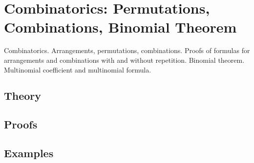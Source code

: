 
\section{Combinatorics: Permutations, Combinations, Binomial Theorem}
\label{sec:2.2.04-combinatorics-basics}

\begin{ticket}
Combinatorics. Arrangements, permutations, combinations. Proofs of formulas for arrangements and combinations with and without repetition. Binomial theorem. Multinomial coefficient and multinomial formula.
\end{ticket}

\subsection*{Theory}

\subsection*{Proofs}

\subsection*{Examples}
